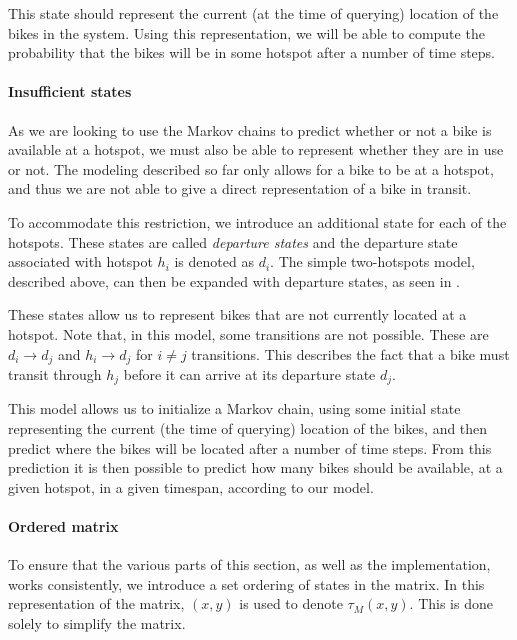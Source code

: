 This state should represent the current (at the time of querying) location of the bikes in the system.
Using this representation, we will be able to compute the probability that the bikes will be in some hotspot after a number of time steps.

\paragraph{Insufficient states}
As we are looking to use the Markov chains to predict whether or not a bike is available at a hotspot, we must also be able to represent whether they are in use or not.
The modeling described so far only allows for a bike to be at a hotspot, and thus we are not able to give a direct representation of a bike in transit.

To accommodate this restriction, we introduce an additional state for each of the hotspots.
These states are called \emph{departure states} and the departure state associated with hotspot $h_i$ is denoted as $d_i$.
The simple two-hotspots model, described above, can then be expanded with departure states, as seen in .



These states allow us to represent bikes that are not currently located at a hotspot.
Note that, in this model, some transitions are not possible.
These are $d_i \rightarrow d_j$ and $h_i \rightarrow d_j $ for $i \neq j$ transitions.
This describes the fact that a bike must transit through $h_j$ before it can arrive at its departure state $d_j$.

This model allows us to initialize a Markov chain, using some initial state representing the current (the time of querying) location of the bikes, and then predict where the bikes will be located after a number of time steps.
From this prediction it is then possible to predict how many bikes should be available, at a given hotspot, in a given timespan, according to our model.

\paragraph{Ordered matrix}
To ensure that the various parts of this section, as well as the implementation, works consistently, we introduce a set ordering of states in the matrix.
In this representation of the matrix, $(x, y)$ is used to denote $\tau_M(x, y)$.
This is done solely to simplify the matrix.

